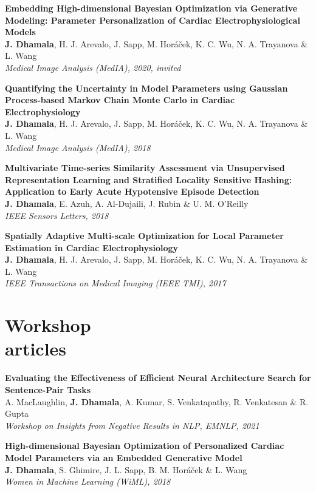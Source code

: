 \documentclass[margin]{res}
\begin{document}
\begin{resume}
\textbf{Embedding High-dimensional Bayesian Optimization via  Generative Modeling: Parameter Personalization of Cardiac Electrophysiological Models}\\
\small{\textbf{J. Dhamala}, H. J. Arevalo, J. Sapp, M. Hor\'{a}\v{c}ek, K. C. Wu, N. A. Trayanova \& L. Wang}\\
{\sl Medical Image Analysis (MedIA), 2020, invited}

\textbf{Quantifying the Uncertainty in Model Parameters using Gaussian Process-based Markov Chain Monte Carlo in Cardiac Electrophysiology}\\
\small{\textbf{J. Dhamala}, H. J. Arevalo, J. Sapp, M. Hor\'{a}\v{c}ek, K. C. Wu, N. A. Trayanova \& L. Wang}\\
{\sl Medical Image Analysis (MedIA), 2018}

\textbf{Multivariate Time-series Similarity Assessment via Unsupervised Representation Learning and Stratified Locality Sensitive Hashing: Application to Early Acute Hypotensive Episode Detection}\\
\small{\textbf{J. Dhamala}, E. Azuh, A. Al-Dujaili, J. Rubin \& U. M. O'Reilly}\\
{\sl IEEE Sensors Letters, 2018}

\textbf{Spatially Adaptive Multi-scale Optimization for Local Parameter Estimation in Cardiac Electrophysiology}\\
\small{\textbf{J. Dhamala}, H. J. Arevalo, J. Sapp, M. Hor\'{a}\v{c}ek, K. C. Wu, N. A. Trayanova \& L. Wang}\\
{\sl IEEE Transactions on Medical Imaging (IEEE TMI), 2017}

\section{Workshop\\articles}

\textbf{Evaluating the Effectiveness of Efficient Neural Architecture Search for Sentence-Pair Tasks}\\
A. MacLaughlin, \textbf{J. Dhamala}, A. Kumar, S. Venkatapathy, R. Venkatesan \& R. Gupta\\
{\sl Workshop on Insights from Negative Results in NLP, EMNLP, 2021}

\textbf{High-dimensional Bayesian Optimization of Personalized Cardiac Model Parameters via an Embedded Generative Model}\\
\textbf{J. Dhamala}, S. Ghimire, J. L. Sapp, B. M. Hor\'{a}\v{c}ek \& L. Wang\\
{\sl Women in Machine Learning (WiML), 2018}


\end{resume}
\end{document}
